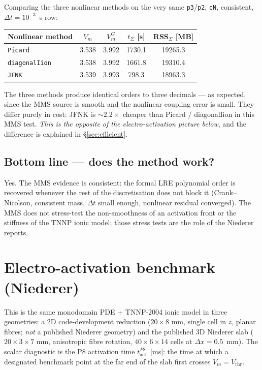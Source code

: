 \documentclass[11pt,a4paper]{article}
\newcommand{\Vm}{V_{m}}
\newcommand{\tact}{t_{\text{act}}^{P8}}
\newcommand{\code}[1]{\texttt{\small #1}}
\begin{document}
Comparing the three nonlinear methods on the very same
\code{p3}/\code{p2}, \code{cN}, consistent, $\Delta t = 10^{-3}$~s row:

\begin{center}\footnotesize
\begin{tabular}{lcccc}
\toprule
Nonlinear method  & $\Vm$ & $\Vm^G$ & $t_\Sigma$ [s] & RSS$_\Sigma$ [MB] \\
\midrule
\code{Picard}       & 3.538 & 3.992 & 1730.1 & 19265.3 \\
\code{diagonalIion} & 3.538 & 3.992 & 1661.8 & 19310.4 \\
\code{JFNK}         & 3.539 & 3.993 &  798.3 & 18963.3 \\
\bottomrule
\end{tabular}\end{center}

The three methods produce identical orders to three decimals --- as
expected, since the MMS source is smooth and the nonlinear coupling
error is small. They differ purely in cost: JFNK is $\sim 2.2\times$
cheaper than Picard / diagonalIion in this MMS test. \emph{This is
the opposite of the electro-activation picture below}, and the
difference is explained in \S\ref{sec:efficient}.

\subsection{Bottom line --- does the method work?}

Yes. The MMS evidence is consistent: the formal LRE polynomial order
is recovered whenever the rest of the discretisation does not block
it (Crank--Nicolson, consistent mass, $\Delta t$ small enough,
nonlinear residual converged). The MMS does not stress-test the
non-smoothness of an activation front or the stiffness of the TNNP
ionic model; those stress tests are the role of the Niederer reports.

\section{Electro-activation benchmark (Niederer)}
\label{sec:niederer}

This is the same monodomain PDE + TNNP-2004 ionic model in three
geometries: a 2D code-development reduction ($20\times 8$ mm, single
cell in $z$, planar fibres; \emph{not} a published Niederer geometry)
and the published 3D Niederer slab ($20\times 3\times 7$ mm,
anisotropic fibre rotation, $40\times 6\times 14$ cells at
$\Delta x = 0.5$~mm). The scalar diagnostic is the P8 activation time
$\tact$~[ms]: the time at which a designated benchmark point at the
far end of the slab first crosses $\Vm = V_{\text{thr}}$.
\end{document}

